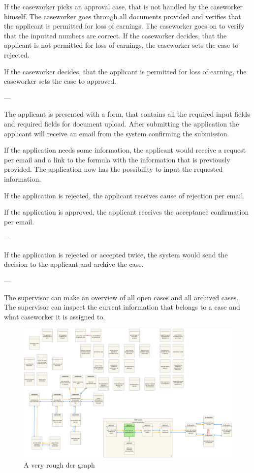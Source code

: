 If the caseworker picks an approval case, that is not handled by the caseworker himself. The caseworker goes through all documents provided and verifies that the applicant is permitted for loss of earnings. The caseworker goes on to verify that the inputted numbers are correct.
If the caseworker decides, that the applicant is not permitted for loss of earnings, the caseworker sets the case to rejected.

If the caseworker decides, that the applicant is permitted for loss of earning, the caseworker sets the case to approved.

---

The applicant is presented with a form, that contains all the required input fields and required fields for document upload. After submitting the application the applicant will receive an email from the system confirming the submission.

If the application needs some information, the applicant would receive a request per email and a link to the formula with the information that is previously provided. The application now has the possibility to input the requested information. 

If the application is rejected, the applicant receives cause of rejection per email.

If the application is approved, the applicant receives the acceptance confirmation per email. 

---

If the application is rejected or accepted twice, the system would send the decision to the applicant and archive the case. 

---

The supervisor can make an overview of all open cases and all archived cases. The supervisor can inspect the current information that belongs to a case and what caseworker it is assigned to.

\begin{figure}[htb!]
	\includegraphics[width=\textwidth]{img/dcr}
	\caption{A very rough dcr graph}
\end{figure}